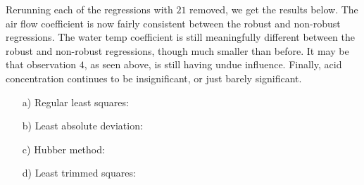 \documentclass[11pt]{article}
\theoremstyle{definition}
\begin{document}
\begin{itemize}
        Rerunning each of the regressions with $21$ removed, we get the results below. The air flow coefficient is now fairly consistent between the robust and non-robust regressions. The water temp coefficient is still meaningfully different between the robust and non-robust regressions, though much smaller than before. It may be that observation $4$, as seen above, is still having undue influence. Finally, acid concentration continues to be insignificant, or just barely significant.
        \begin{itemize}
            \item[a)] Regular least squares: \\
                \FloatBarrier
                
                \FloatBarrier
            \item[b)] Least absolute deviation: \\
                \FloatBarrier
                
                \FloatBarrier
            \item[c)] Hubber method:\\
                \FloatBarrier
                
                \FloatBarrier
            \item[d)] Least trimmed squares: \\
                \FloatBarrier
                
                \FloatBarrier
        \end{itemize}

    
\end{itemize}
\end{document}
